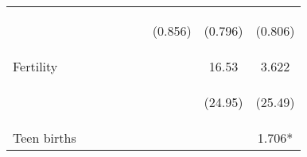 \begin{landscape}
\begin{table}[htpb!]
\begin{center}
\begin{tabular}{lcccccccc}
	& \begin{footnotesize}		\end{footnotesize} & \begin{footnotesize}		\end{footnotesize} & \begin{footnotesize}		\end{footnotesize} & \begin{footnotesize}		\end{footnotesize} & \begin{footnotesize}		\end{footnotesize} & \begin{footnotesize}	(0.856)	\end{footnotesize} & \begin{footnotesize}	(0.796)	\end{footnotesize} & \begin{footnotesize}	(0.806)	\end{footnotesize} \\	
Fertility	&		&		&		&		&		&		&	16.53	&	3.622	\\	
	& \begin{footnotesize}		\end{footnotesize} & \begin{footnotesize}		\end{footnotesize} & \begin{footnotesize}		\end{footnotesize} & \begin{footnotesize}		\end{footnotesize} & \begin{footnotesize}		\end{footnotesize} & \begin{footnotesize}		\end{footnotesize} & \begin{footnotesize}	(24.95)	\end{footnotesize} & \begin{footnotesize}	(25.49)	\end{footnotesize} \\	
Teen births	&		&		&		&		&		&		&		&	1.706*	\\	

\end{tabular}
\end{center}
\end{table}
\end{landscape}

